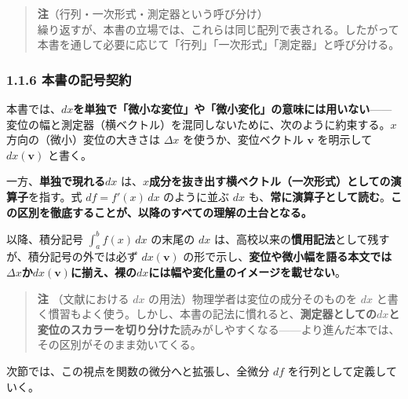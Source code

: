 \documentclass[a4paper,12pt,openany]{book}
\begin{document}
\begin{quote}
\textbf{注}（行列・一次形式・測定器という呼び分け）\\
繰り返すが、本書の立場では、これらは同じ配列で表される。したがって本書を通して必要に応じて「行列」「一次形式」「測定器」と呼び分ける。
\end{quote}

\hypertarget{ux672cux66f8ux306eux8a18ux53f7ux5951ux7d04}{%
\subsubsection{1.1.6
本書の記号契約}\label{ux672cux66f8ux306eux8a18ux53f7ux5951ux7d04}}

本書では、\(dx\)\textbf{を単独で「微小な変位」や「微小変化」の意味には用いない}——変位の幅と測定器（横ベクトル）を混同しないために、次のように約束する。\(x\)
方向の（微小）変位の大きさは \(\Delta x\) を使うか、変位ベクトル
\(\mathbf{v}\) を明示して \(dx(\mathbf{v})\) と書く。

一方、\textbf{単独で現れる}\(dx\)
は、\(x\)\textbf{成分を抜き出す横ベクトル（一次形式）としての演算子}を指す。式
\(df = f'(x)\,dx\) のように並ぶ \(dx\)
も、\textbf{常に演算子として読む}。\textbf{この区別を徹底することが、以降のすべての理解の土台となる。}

以降、積分記号 \(\int_a^b f(x)\,dx\) の末尾の \(dx\)
は、高校以来の\textbf{慣用記法}として残すが、積分記号の外では必ず
\(dx(\mathbf{v})\)
の形で示し、\textbf{変位や微小幅を語る本文では}\(\Delta x\)\textbf{か}\(dx(\mathbf{v})\)\textbf{に揃え、裸の}\(dx\)\textbf{には幅や変化量のイメージを載せない}。

\begin{quote}
\textbf{注} （文献における \(dx\) の用法）物理学者は変位の成分そのものを
\(dx\)
と書く慣習もよく使う。しかし、本書の記法に慣れると、\textbf{測定器としての}\(dx\)\textbf{と変位のスカラーを切り分けた}読みがしやすくなる——より進んだ本では、その区別がそのまま効いてくる。
\end{quote}

次節では、この視点を関数の微分へと拡張し、全微分 \(df\)
を行列として定義していく。

\par\vspace{0.35em}\par
\end{document}
